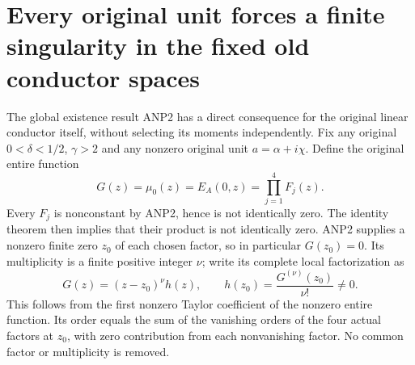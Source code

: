 \section{Every original unit forces a finite singularity in the fixed old conductor spaces}
The global existence result ANP2 has a direct consequence for the original
linear conductor itself, without selecting its moments independently.
Fix any original $0<\delta<1/2$, $\gamma>2$ and any nonzero original
unit $a=\alpha+i\chi$. Define the original entire function
\[
 G(z)=\mu_0(z)=E_A(0,z)=\prod_{j=1}^4F_j(z).
 \tag{GUC1}
\]
Every $F_j$ is nonconstant by ANP2, hence is not identically zero.
The identity theorem then implies that their product is not identically
zero. ANP2 supplies a nonzero finite zero $z_0$ of each chosen factor,
so in particular $G(z_0)=0$. Its multiplicity is a finite positive
integer $\nu$; write its complete local factorization as
\[
 G(z)=(z-z_0)^\nu h(z),\qquad
 h(z_0)=\frac{G^{(\nu)}(z_0)}{\nu!}\ne0.
 \tag{GUC2}
\]
This follows from the first nonzero Taylor coefficient of the nonzero
entire function. Its order equals the sum of the vanishing orders of
the four actual factors at $z_0$, with zero contribution from each
nonvanishing factor. No common factor or multiplicity is removed.


